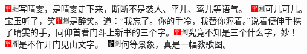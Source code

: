 {\includegraphics[width=3mm]{../Images/00002}\includegraphics[width=3mm]{../Images/00012}\footnotesize \kaishu 写晴雯，是晴雯走下来，断断不是袭人、平儿、莺儿等语气。　\includegraphics[width=3mm]{../Images/00002}\includegraphics[width=3mm]{../Images/00011}\footnotesize \kaishu 可儿可儿。}宝玉听了，笑{\includegraphics[width=3mm]{../Images/00002}\includegraphics[width=3mm]{../Images/00011}\footnotesize \kaishu 是醉笑。}道：“我忘了。你的手冷，我替你渥着。”说着便伸手携了晴雯的手，同仰首看门斗上新书的三个字。{{\includegraphics[width=3mm]{../Images/00002}\includegraphics[width=3mm]{../Images/00011}\footnotesize \kaishu 究竟不知是三个什么字，妙！　\includegraphics[width=3mm]{../Images/00002}\includegraphics[width=3mm]{../Images/00010}\footnotesize \kaishu 是不作开门见山文字。　}\includegraphics[width=3mm]{../Images/00006}\includegraphics[width=3mm]{../Images/00011}\footnotesize \kaishu 何等景象，真是一幅教歌图。}

